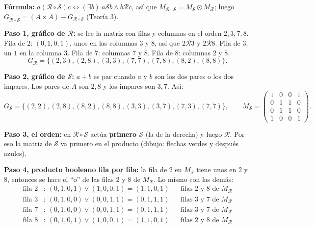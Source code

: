 \documentclass[11pt]{article}
\begin{document}
\begin{explica}
\textbf{Fórmula:} $a(\mathcal R\circ\mathcal S)c\iff(\exists b)\ a\mathcal Sb\wedge b\mathcal Rc$, así que $M_{\mathcal R\circ\mathcal S}=M_{\mathcal S}\odot M_{\mathcal R}$; luego $G_{\overline{\mathcal R\circ\mathcal S}}=(A\times A)-G_{\mathcal R\circ\mathcal S}$ (Teoría 3).

\textbf{Paso 1, gráfico de $\mathcal R$:} se lee la matriz con filas y columnas en el orden $2,3,7,8$. Fila de $2$: $(0,1,0,1)$, unos en las columnas $3$ y $8$, así que $2\mathcal R3$ y $2\mathcal R8$. Fila de $3$: un $1$ en la columna $3$. Fila de $7$: columnas $7$ y $8$. Fila de $8$: columnas $2$ y $8$.
\[
G_{\mathcal R}=\{(2,3),(2,8),(3,3),(7,7),(7,8),(8,2),(8,8)\}.
\]

\textbf{Paso 2, gráfico de $\mathcal S$:} $a+b$ es par cuando $a$ y $b$ son los dos pares o los dos impares. Los pares de $A$ son $2,8$ y los impares son $3,7$. Así:
\[
G_{\mathcal S}=\{(2,2),(2,8),(8,2),(8,8),(3,3),(3,7),(7,3),(7,7)\},\qquad
M_{\mathcal S}=\begin{pmatrix}1&0&0&1\\0&1&1&0\\0&1&1&0\\1&0&0&1\end{pmatrix}.
\]

\textbf{Paso 3, el orden:} en $\mathcal R\circ\mathcal S$ actúa \textbf{primero $\mathcal S$} (la de la derecha) y luego $\mathcal R$. Por eso la matriz de $\mathcal S$ va primero en el producto (dibujo: flechas verdes y después azules).

\textbf{Paso 4, producto booleano fila por fila:} la fila de $2$ en $M_{\mathcal S}$ tiene unos en $2$ y $8$, entonces se hace el ``o'' de las filas $2$ y $8$ de $M_{\mathcal R}$. Lo mismo con las demás:
\begin{align*}
\text{fila } 2&:\ (0,1,0,1)\vee(1,0,0,1)=(1,1,0,1) &&\text{filas 2 y 8 de } M_{\mathcal R}\\
\text{fila } 3&:\ (0,1,0,0)\vee(0,0,1,1)=(0,1,1,1) &&\text{filas 3 y 7 de } M_{\mathcal R}\\
\text{fila } 7&:\ (0,1,0,0)\vee(0,0,1,1)=(0,1,1,1) &&\text{filas 3 y 7 de } M_{\mathcal R}\\
\text{fila } 8&:\ (0,1,0,1)\vee(1,0,0,1)=(1,1,0,1) &&\text{filas 2 y 8 de } M_{\mathcal R}
\end{align*}


\end{explica}
\end{document}
